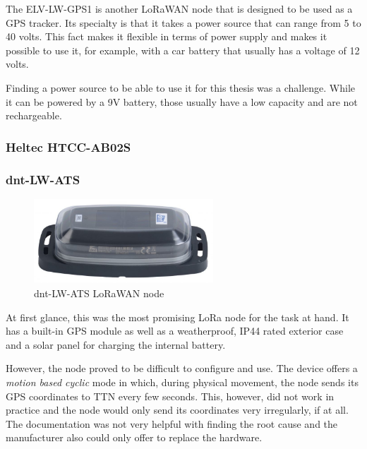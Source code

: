 The ELV-LW-GPS1 is another \ac{LoRaWAN} node that is designed to be used as a \ac{GPS} tracker.
Its specialty is that it takes a power source that can range from 5 to 40 volts.
This fact makes it flexible in terms of power supply and makes it possible to use it, for example, with a car battery that usually has a voltage of 12 volts.

Finding a power source to be able to use it for this thesis was a challenge.
While it can be powered by a 9V battery, those usually have a low capacity and are not rechargeable.


\subsubsection{Heltec HTCC-AB02S}



\subsubsection{dnt-LW-ATS}

\begin{figure}
    \centering
    \includegraphics[width=0.6\textwidth]{pictures/hardware/gps-nodes/dnt-LW-ATS.jpg}
    \caption{dnt-LW-ATS \ac{LoRaWAN} node~\protect\cite{dnt_gmbh_dnt_nodate}}
\end{figure}

At first glance, this was the most promising \ac{LoRa} node for the task at hand.
It has a built-in \ac{GPS} module as well as a weatherproof, IP44 rated exterior case and a solar panel for charging the internal battery.

However, the node proved to be difficult to configure and use.
The device offers a \emph{motion based cyclic} mode in which, during physical movement, the node sends its \ac{GPS} coordinates to \ac{TTN} every few seconds.
This, however, did not work in practice and the node would only send its coordinates very irregularly, if at all.
The documentation was not very helpful with finding the root cause and the manufacturer also could only offer to replace the hardware.

